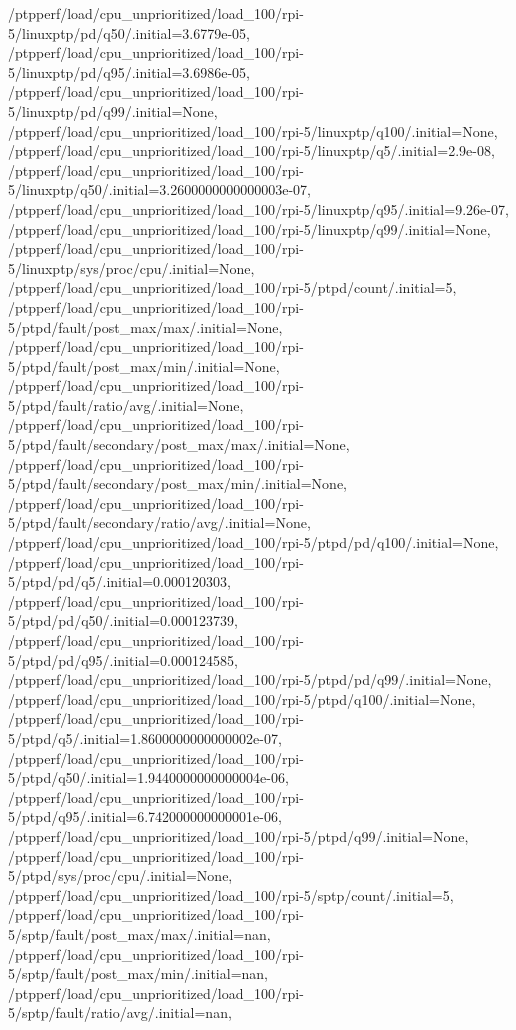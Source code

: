 {    /ptpperf/load/cpu_unprioritized/load_100/rpi-5/linuxptp/pd/q50/.initial=3.6779e-05,
    /ptpperf/load/cpu_unprioritized/load_100/rpi-5/linuxptp/pd/q95/.initial=3.6986e-05,
    /ptpperf/load/cpu_unprioritized/load_100/rpi-5/linuxptp/pd/q99/.initial=None,
    /ptpperf/load/cpu_unprioritized/load_100/rpi-5/linuxptp/q100/.initial=None,
    /ptpperf/load/cpu_unprioritized/load_100/rpi-5/linuxptp/q5/.initial=2.9e-08,
    /ptpperf/load/cpu_unprioritized/load_100/rpi-5/linuxptp/q50/.initial=3.2600000000000003e-07,
    /ptpperf/load/cpu_unprioritized/load_100/rpi-5/linuxptp/q95/.initial=9.26e-07,
    /ptpperf/load/cpu_unprioritized/load_100/rpi-5/linuxptp/q99/.initial=None,
    /ptpperf/load/cpu_unprioritized/load_100/rpi-5/linuxptp/sys/proc/cpu/.initial=None,
    /ptpperf/load/cpu_unprioritized/load_100/rpi-5/ptpd/count/.initial=5,
    /ptpperf/load/cpu_unprioritized/load_100/rpi-5/ptpd/fault/post_max/max/.initial=None,
    /ptpperf/load/cpu_unprioritized/load_100/rpi-5/ptpd/fault/post_max/min/.initial=None,
    /ptpperf/load/cpu_unprioritized/load_100/rpi-5/ptpd/fault/ratio/avg/.initial=None,
    /ptpperf/load/cpu_unprioritized/load_100/rpi-5/ptpd/fault/secondary/post_max/max/.initial=None,
    /ptpperf/load/cpu_unprioritized/load_100/rpi-5/ptpd/fault/secondary/post_max/min/.initial=None,
    /ptpperf/load/cpu_unprioritized/load_100/rpi-5/ptpd/fault/secondary/ratio/avg/.initial=None,
    /ptpperf/load/cpu_unprioritized/load_100/rpi-5/ptpd/pd/q100/.initial=None,
    /ptpperf/load/cpu_unprioritized/load_100/rpi-5/ptpd/pd/q5/.initial=0.000120303,
    /ptpperf/load/cpu_unprioritized/load_100/rpi-5/ptpd/pd/q50/.initial=0.000123739,
    /ptpperf/load/cpu_unprioritized/load_100/rpi-5/ptpd/pd/q95/.initial=0.000124585,
    /ptpperf/load/cpu_unprioritized/load_100/rpi-5/ptpd/pd/q99/.initial=None,
    /ptpperf/load/cpu_unprioritized/load_100/rpi-5/ptpd/q100/.initial=None,
    /ptpperf/load/cpu_unprioritized/load_100/rpi-5/ptpd/q5/.initial=1.8600000000000002e-07,
    /ptpperf/load/cpu_unprioritized/load_100/rpi-5/ptpd/q50/.initial=1.9440000000000004e-06,
    /ptpperf/load/cpu_unprioritized/load_100/rpi-5/ptpd/q95/.initial=6.742000000000001e-06,
    /ptpperf/load/cpu_unprioritized/load_100/rpi-5/ptpd/q99/.initial=None,
    /ptpperf/load/cpu_unprioritized/load_100/rpi-5/ptpd/sys/proc/cpu/.initial=None,
    /ptpperf/load/cpu_unprioritized/load_100/rpi-5/sptp/count/.initial=5,
    /ptpperf/load/cpu_unprioritized/load_100/rpi-5/sptp/fault/post_max/max/.initial=nan,
    /ptpperf/load/cpu_unprioritized/load_100/rpi-5/sptp/fault/post_max/min/.initial=nan,
    /ptpperf/load/cpu_unprioritized/load_100/rpi-5/sptp/fault/ratio/avg/.initial=nan,
}
